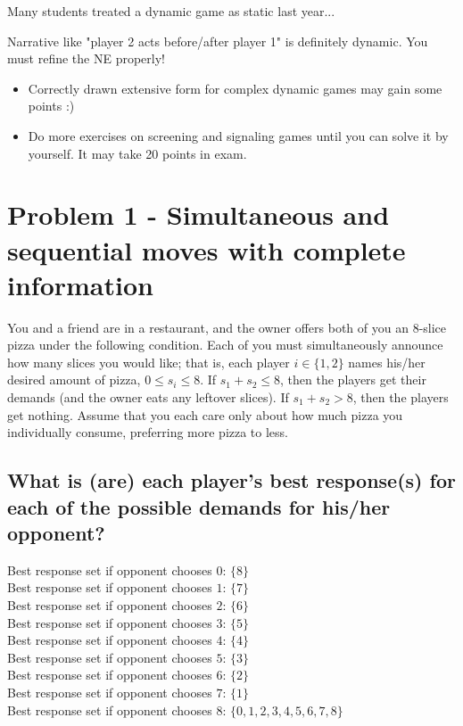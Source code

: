 \documentclass{article}
\begin{document}
\begin{mdframed}[backgroundcolor=yellow!20,linecolor=white]
Many students treated a dynamic game as static last year...

Narrative like "player 2 acts before/after player 1" is definitely dynamic. You must refine the NE properly! 

\begin{itemize}
\item Correctly drawn extensive form for complex dynamic games may gain some points :)
\item Do more exercises on screening and signaling games until you can solve it by yourself. It may take 20 points in exam.
\end{itemize}
\end{mdframed}

\newpage
\section{Problem 1 - Simultaneous and sequential moves with complete information}


You and a friend are in a restaurant, and the owner offers both of you an 8-slice pizza under
the following condition. Each of you must simultaneously announce how many slices you would
like; that is, each player $i \in \{1, 2\}$ names his/her desired amount of pizza, $0 \leq s_i
\leq 8$. If $s_1 + s_2 \leq 8$, then the players get their demands (and the owner eats any
leftover slices). If $s_1 + s_2 > 8$, then the players get nothing. Assume that you each care
only about how much pizza you individually consume, preferring more pizza to less.


\subsection{What is (are) each player's best response(s) for each of the possible demands for his/her
opponent?}


Best response set if opponent chooses $0$: $\{8\}$ \\
Best response set if opponent chooses $1$: $\{7\}$ \\
Best response set if opponent chooses $2$: $\{6\}$ \\
Best response set if opponent chooses $3$: $\{5\}$ \\
Best response set if opponent chooses $4$: $\{4\}$ \\
Best response set if opponent chooses $5$: $\{3\}$ \\
Best response set if opponent chooses $6$: $\{2\}$ \\
Best response set if opponent chooses $7$: $\{1\}$ \\
Best response set if opponent chooses $8$: $\{0,1,2,3,4,5,6,7,8\}$
\end{document}
